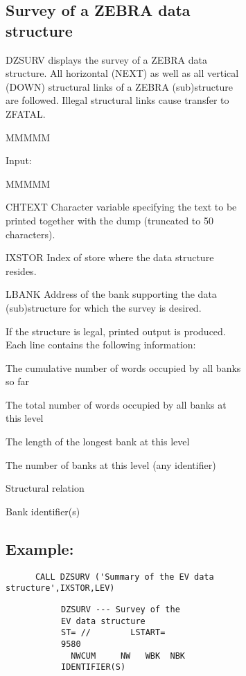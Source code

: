 \begin{figure}
\begin{figure}
\subsection{Survey of a ZEBRA data structure}
\par DZSURV displays the survey of a ZEBRA data structure.
All horizontal (NEXT) as well as all vertical (DOWN) structural
links of a ZEBRA (sub)structure are followed.
Illegal structural links cause transfer to ZFATAL.
\begin{DL}{MMMMM}
\item[Input:
]
\begin{DL}{MMMMM}
\item[CHTEXT
]Character variable specifying the text to be printed
together with the dump (truncated to 50 characters).
\item[IXSTOR
]Index of store where the data structure resides.
\item[LBANK
]Address of the bank supporting the data (sub)structure for which
the survey is desired.
\end{DL}
\end{DL}
If the structure is legal, printed output is produced.
Each line contains the following information:
\begin{UL}
\item The cumulative number of words occupied by all banks so far
\item The total number of words occupied by all banks at this level
\item The length of the longest bank at this level
\item The number of banks at this level (any identifier)
\item Structural relation
\item Bank identifier(s)
\end{UL}
\subsection{Example:}
\begin{verbatim}
      CALL DZSURV ('Summary of the EV data structure',IXSTOR,LEV)
\end{verbatim}
\begin{figure}
\begin{figure}
\begin{verbatim}
DZSURV --- Survey of the EV data structure                    ST= //        LSTART=     9580
  NWCUM     NW   WBK  NBK    IDENTIFIER(S)
 

\end{verbatim}
\end{figure}
\end{figure}
\end{figure}
\end{figure}
